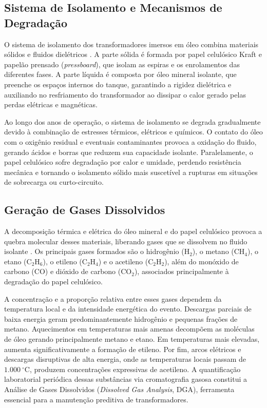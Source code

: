 \subsection{Sistema de Isolamento e Mecanismos de Degradação}

O sistema de isolamento dos transformadores imersos em óleo combina materiais sólidos e fluidos dielétricos \cite{ali2023}. A parte sólida é formada por papel celulósico Kraft e papelão prensado (\textit{pressboard}), que isolam as espiras e os enrolamentos das diferentes fases. A parte líquida é composta por óleo mineral isolante, que preenche os espaços internos do tanque, garantindo a rigidez dielétrica e auxiliando no resfriamento do transformador ao dissipar o calor gerado pelas perdas elétricas e magnéticas.

Ao longo dos anos de operação, o sistema de isolamento se degrada gradualmente devido à combinação de estresses térmicos, elétricos e químicos. O contato do óleo com o oxigênio residual e eventuais contaminantes provoca a oxidação do fluido, gerando ácidos e borras que reduzem sua capacidade isolante. Paralelamente, o papel celulósico sofre degradação por calor e umidade, perdendo resistência mecânica e tornando o isolamento sólido mais suscetível a rupturas em situações de sobrecarga ou curto-circuito.

\subsection{Geração de Gases Dissolvidos}

A decomposição térmica e elétrica do óleo mineral e do papel celulósico provoca a quebra molecular desses materiais, liberando gases que se dissolvem no fluido isolante \cite{ali2023}. Os principais gases formados são o hidrogênio ($\text{H}_2$), o metano ($\text{CH}_4$), o etano ($\text{C}_2\text{H}_6$), o etileno ($\text{C}_2\text{H}_4$) e o acetileno ($\text{C}_2\text{H}_2$), além do monóxido de carbono ($\text{CO}$) e dióxido de carbono ($\text{CO}_2$), associados principalmente à degradação do papel celulósico.

A concentração e a proporção relativa entre esses gases dependem da temperatura local e da intensidade energética do evento. Descargas parciais de baixa energia geram predominantemente hidrogênio e pequenas frações de metano. Aquecimentos em temperaturas mais amenas decompõem as moléculas de óleo gerando principalmente metano e etano. Em temperaturas mais elevadas, aumenta significativamente a formação de etileno. Por fim, arcos elétricos e descargas disruptivas de alta energia, onde as temperaturas locais passam de $1.000~^\circ\text{C}$, produzem concentrações expressivas de acetileno. A quantificação laboratorial periódica dessas substâncias via cromatografia gasosa constitui a Análise de Gases Dissolvidos (\textit{Dissolved Gas Analysis}, DGA), ferramenta essencial para a manutenção preditiva de transformadores.

